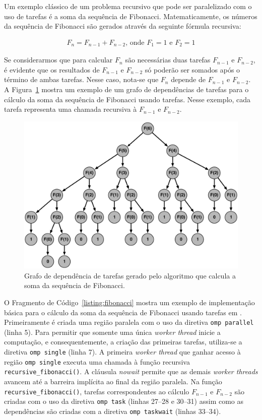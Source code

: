 \documentclass{SBCbookchapter}
\begin{document}
	Um exemplo clássico de um problema recursivo que pode ser
	paralelizado com o uso de tarefas é a soma da sequência de
	Fibonacci. Matematicamente, os números da sequência de Fibonacci são
	gerados através da seguinte fórmula recursiva:
	
	\begin{align*}
		F_n = F_{n-1} + F_{n-2} \text{, onde } F_1=1 \text{ e } F_2=1
	\end{align*}

	Se considerarmos que para calcular $F_n$ são necessárias duas
	tarefas $F_{n-1}$ e $F_{n-2}$, é evidente que os resultados de
	$F_{n-1}$ e $F_{n-2}$ só poderão ser somados após o término de ambas
	tarefas. Nesse caso, nota-se que $F_n$ depende de $F_{n-1}$ e
	$F_{n-2}$. A Figura~\ref{fig:fibonacci} mostra um exemplo de um
	grafo de dependências de tarefas para o cálculo da soma da sequência
	de Fibonacci usando tarefas. Nesse exemplo, cada tarefa representa
	uma chamada recursiva à $F_{n-1}$ e $F_{n-2}$.

	\begin{figure}[t]
		\centering
		\includegraphics[width=0.8\linewidth]{img/fibonacci}
		\caption{Grafo de dependência de tarefas gerado pelo algoritmo que calcula a soma da sequência
		de Fibonacci.}\label{fig:fibonacci}
	\end{figure}

	O Fragmento de Código~\ref{listing:fibonacci} mostra um exemplo de
	implementação básica para o cálculo da soma da sequência de
	Fibonacci usando tarefas em \openmp. Primeiramente é criada uma
	região paralela com o uso da diretiva \texttt{omp parallel} (linha
	5). Para permitir que somente uma única \textit{worker thread}
	inicie a computação, e consequentemente, a criação das primeiras
	tarefas, utiliza-se a diretiva \texttt{omp single} (linha 7). A
	primeira \textit{worker thread} que ganhar acesso à região
	\texttt{omp single} executa uma chamada à função recursiva
	\texttt{recursive\_fibonacci()}. A cláusula \textit{nowait} permite
	que as demais \textit{worker threads} avancem até a barreira
	implícita ao final da região paralela. Na função
	\texttt{recursive\_fibonacci()}, tarefas correspondentes ao cálculo
	$F_{n-1}$ e $F_{n-2}$ são criadas com o uso da diretiva \texttt{omp
	task} (linhas 27--28 e 30--31) assim como as dependências são
	criadas com a diretiva \texttt{omp taskwait} (linhas 33--34).
	
\end{document}
